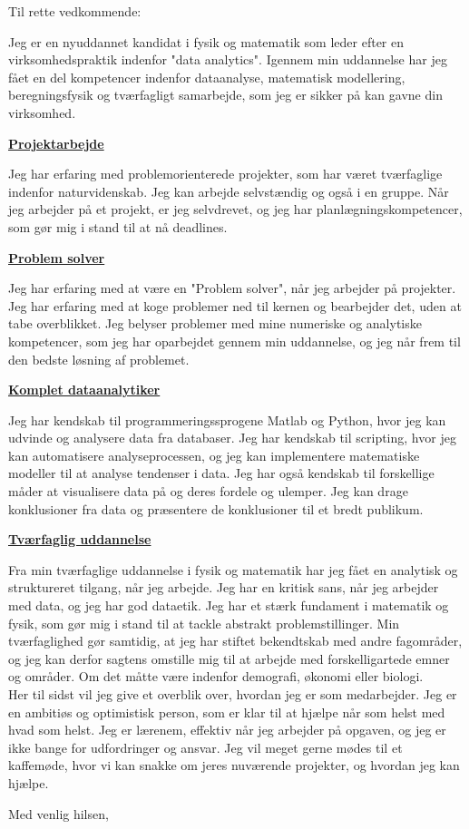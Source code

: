 \documentclass[10pt,a4paper]{letter}
\begin{document}
\begin{letter}{}
\opening{Til rette vedkommende:}
Jeg er en nyuddannet kandidat i fysik og matematik som leder efter en virksomhedspraktik indenfor "data analytics". Igennem min uddannelse har jeg fået en del kompetencer indenfor dataanalyse, matematisk modellering, beregningsfysik og tværfagligt samarbejde, som jeg er sikker på kan gavne din virksomhed.

\underline{\textbf{Projektarbejde}}

Jeg har erfaring med problemorienterede projekter, som har været tværfaglige indenfor naturvidenskab. Jeg kan arbejde selvstændig og også i en gruppe. Når jeg arbejder på et projekt, er jeg selvdrevet, og jeg har planlægningskompetencer, som gør mig i stand til at nå deadlines.   

 
\underline{\textbf{Problem solver}}

Jeg har erfaring med at være en "Problem solver", når jeg arbejder på projekter. Jeg har erfaring med at koge problemer ned til kernen og bearbejder det, uden at tabe overblikket. Jeg belyser problemer med mine numeriske og analytiske kompetencer, som jeg har oparbejdet gennem min uddannelse, og jeg når frem til den bedste løsning af problemet.
   

\underline{\textbf{Komplet dataanalytiker}}

Jeg har kendskab til programmeringssprogene Matlab og Python, hvor jeg kan udvinde og analysere data fra databaser. Jeg har kendskab til scripting, hvor jeg kan automatisere analyseprocessen, og jeg kan implementere matematiske modeller til at analyse tendenser i data. Jeg har også kendskab til forskellige måder at visualisere data på og deres fordele og ulemper. Jeg kan drage konklusioner fra data og præsentere de konklusioner til et bredt publikum. 


\underline{\textbf{Tværfaglig uddannelse}}

Fra min tværfaglige uddannelse i fysik og matematik har jeg fået en analytisk og struktureret tilgang, når jeg arbejde. Jeg har en kritisk sans, når jeg arbejder med data, og jeg har god dataetik. Jeg har et stærk fundament i matematik og fysik, som gør mig i stand til at tackle abstrakt problemstillinger. Min tværfaglighed gør samtidig, at jeg har stiftet bekendtskab med andre fagområder, og jeg kan derfor sagtens omstille mig til at arbejde med forskelligartede emner og områder. Om det måtte være indenfor demografi, økonomi eller biologi.  
\\

Her til sidst vil jeg give et overblik over, hvordan jeg er som medarbejder. Jeg er en ambitiøs og optimistisk person, som er klar til at hjælpe når som helst med hvad som helst. Jeg er lærenem, effektiv når jeg arbejder på opgaven, og jeg er ikke bange for udfordringer og ansvar. Jeg vil meget gerne mødes til et kaffemøde, hvor vi kan snakke om jeres nuværende projekter, og hvordan jeg kan hjælpe.  
   
\closing{Med venlig hilsen,}

\end{letter}
\end{document}
